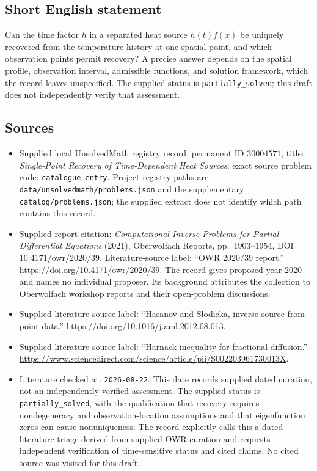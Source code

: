 \documentclass[11pt]{article}
\begin{document}
\subsection{Short English statement}
Can the time factor \(h\) in a separated heat source \(h(t)f(x)\) be uniquely recovered from the temperature history at one spatial point, and which observation points permit recovery? A precise answer depends on the spatial profile, observation interval, admissible functions, and solution framework, which the record leaves unspecified. The supplied status is \texttt{partially\_solved}; this draft does not independently verify that assessment.
\subsection{Sources}
\begin{itemize}
\item Supplied local UnsolvedMath registry record, permanent ID \(30004571\), title: \emph{Single-Point Recovery of Time-Dependent Heat Sources}; exact source problem code: \texttt{catalogue entry}. Project registry paths are \texttt{data/unsolvedmath/problems.json} and the supplementary \texttt{catalog/problems.json}; the supplied extract does not identify which path contains this record.
\item Supplied report citation: \emph{Computational Inverse Problems for Partial Differential Equations} (2021), Oberwolfach Reports, pp.\ 1903--1954, DOI 10.4171/owr/2020/39. Literature-source label: ``OWR 2020/39 report.'' \url{https://doi.org/10.4171/owr/2020/39}. The record gives proposed year 2020 and names no individual proposer. Its background attributes the collection to Oberwolfach workshop reports and their open-problem discussions.
\item Supplied literature-source label: ``Hasanov and Slodicka, inverse source from point data.'' \url{https://doi.org/10.1016/j.aml.2012.08.013}.
\item Supplied literature-source label: ``Harnack inequality for fractional diffusion.'' \url{https://www.sciencedirect.com/science/article/pii/S002203961730013X}.
\item Literature checked at: \texttt{2026-08-22}. This date records supplied dated curation, not an independently verified assessment. The supplied status is \texttt{partially\_solved}, with the qualification that recovery requires nondegeneracy and observation-location assumptions and that eigenfunction zeros can cause nonuniqueness. The record explicitly calls this a dated literature triage derived from supplied OWR curation and requests independent verification of time-sensitive status and cited claims. No cited source was visited for this draft.
\end{itemize}
\end{document}
